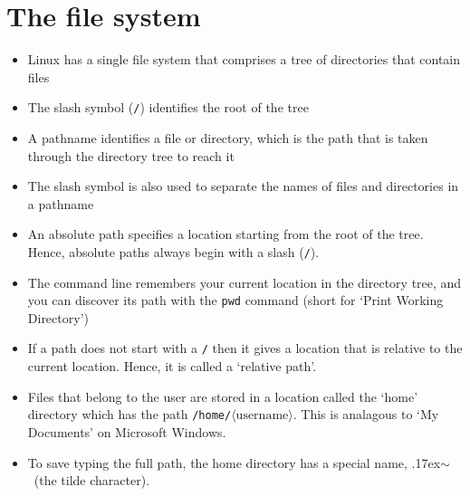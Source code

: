 \documentclass[a4paper,twoside]{memoir}
\newcommand{\shellcmd}{\texttt}
\newcommand{\shellvar}[1]{$\langle \text{#1}\rangle$}
\newcommand{\home}{\raise.17ex\hbox{$\scriptstyle\mathtt{\sim}$}}
\begin{document}
\section{The file system}
\begin{itemize}
\item Linux has a single file system that comprises a tree of directories that contain files
\item The slash symbol (\shellcmd{/}) identifies the root of the tree
\item A pathname identifies a file or directory, which is the path that is taken through the directory tree to reach it
\item The slash symbol is also used to separate the names of files and directories in a pathname
\item An absolute path specifies a location starting from the root of the tree.  Hence, absolute paths always begin with a slash (\shellcmd{/}).
\item The command line remembers your current location in the directory tree, and you can discover its path with the \shellcmd{pwd} command (short for `Print Working Directory')
\item If a path does not start with a \shellcmd{/} then it gives a location that is relative to the current location.  Hence, it is called a `relative path'.
\item Files that belong to the user are stored in a location called the `home' directory which has the path \shellcmd{/home/\shellvar{username}}.  This is analagous to `My Documents' on Microsoft Windows.
\item To save typing the full path, the home directory has a special name, \home\ (the tilde character).
\end{itemize}
\end{document}
